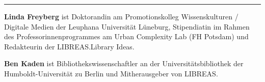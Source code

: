 \begin{center}\rule{0.5\linewidth}{\linethickness}\end{center}

\textbf{Linda Freyberg} ist Doktorandin am Promotionskolleg
Wissenskulturen / Digitale Medien der Leuphana Universität Lüneburg,
Stipendiatin im Rahmen des Professorinnenprogrammes am Urban Complexity
Lab (FH Potsdam) und Redakteurin der LIBREAS.Library Ideas.

\textbf{Ben Kaden} ist Bibliothekswissenschaftler an der
Universitätsbibliothek der Humboldt-Universität zu Berlin und
Mitherausgeber von LIBREAS.
